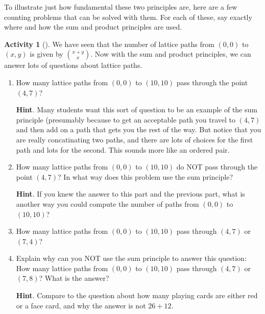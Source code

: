 \documentclass[10pt,]{book}
\theoremstyle{plain}
\theoremstyle{definition}
\theoremstyle{definition}
\theoremstyle{definition}
\newtheorem{activity}[project]{Activity}
\theoremstyle{definition}
\numberwithin{equation}{chapter}
\begin{document}
\hypertarget{p-529}{}%
To illustrate just how fundamental these two principles are, here are a few counting problems that can be solved with them.  For each of these, say exactly where and how the sum and product principles are used.%
\begin{activity}[]\label{activity-28}
\hypertarget{p-530}{}%
We have seen that the number of lattice paths from \((0,0)\) to \((x,y)\) is given by \(\binom{x+y}{x}\).  Now with the sum and product principles, we can answer lots of questions about lattice paths.%
\begin{enumerate}[font=\bfseries,label=(\alph*),ref=\alph*]
\item\label{task-58} \hypertarget{p-531}{}%
How many lattice paths from \((0,0)\) to \((10,10)\) pass through the point \((4,7)\)?%
\par\smallskip%
\noindent\textbf{Hint}.\hypertarget{hint-14}{}\quad%
\hypertarget{p-532}{}%
Many students want this sort of question to be an example of the sum principle (presumably because to get an acceptable path you travel to \((4,7)\) and then add on a path that gets you the rest of the way.  But notice that you are really concatinating two paths, and there are lots of choices for the first path and lots for the second.  This sounds more like an ordered pair.%
\item\label{task-59} \hypertarget{p-533}{}%
How many lattice paths from \((0,0)\) to \((10,10)\) do NOT pass through the point \((4,7)\)?  In what way does this problem use the sum principle?%
\par\smallskip%
\noindent\textbf{Hint}.\hypertarget{hint-15}{}\quad%
\hypertarget{p-534}{}%
If you knew the answer to this part and the previous part, what is another way you could compute the number of paths from \((0,0)\) to \((10,10)\)?%
\item\label{task-60} \hypertarget{p-535}{}%
How many lattice paths from \((0,0)\) to \((10,10)\) pass through \((4,7)\) or \((7,4)\)?%
\item\label{task-61} \hypertarget{p-536}{}%
Explain why can you NOT use the sum principle to answer this question: How many lattice paths from \((0,0)\) to \((10,10)\) pass through \((4,7)\) or \((7,8)\)?  What is the answer?%
\par\smallskip%
\noindent\textbf{Hint}.\hypertarget{hint-16}{}\quad%
\hypertarget{p-537}{}%
Compare to the question about how many playing cards are either red or a face card, and why the answer is not \(26 + 12\).%
\end{enumerate}
\end{activity}
\end{document}
